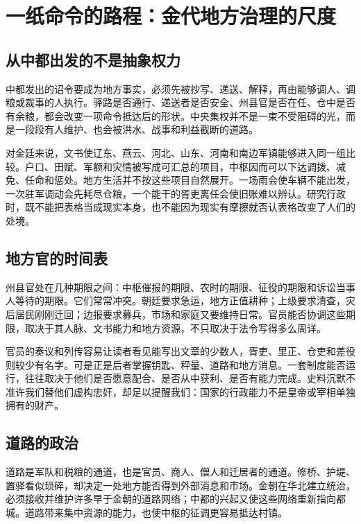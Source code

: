 \section{一纸命令的路程：金代地方治理的尺度}

\subsection{从中都出发的不是抽象权力}

中都发出的诏令要成为地方事实，必须先被抄写、递送、解释，再由能够调人、调粮或裁事的人执行。驿路是否通行、递送者是否安全、州县官是否在任、仓中是否有余粮，都会改变一项命令抵达后的形状。中央集权并不是一束不受阻碍的光，而是一段段有人维护、也会被洪水、战事和利益截断的道路。

对金廷来说，文书使辽东、燕云、河北、山东、河南和南边军镇能够进入同一组比较。户口、田赋、军额和灾情被写成可汇总的项目，中枢因而可以下达调拨、减免、任命和惩处。地方生活并不按这些项目自然展开。一场雨会使车辆不能出发，一次驻军调动会先耗尽仓粮，一个能干的胥吏离任会使旧账难以辨认。研究行政时，既不能把表格当成现实本身，也不能因为现实有摩擦就否认表格改变了人们的处境。

\subsection{地方官的时间表}

州县官处在几种期限之间：中枢催报的期限、农时的期限、征役的期限和诉讼当事人等待的期限。它们常常冲突。朝廷要求急运，地方正值耕种；上级要求清查，灾后居民刚刚迁回；边报要求募兵，市场和家庭又要维持日常。官员能否协调这些期限，取决于其人脉、文书能力和地方资源，不只取决于法令写得多么周详。

官员的奏议和列传容易让读者看见能写出文章的少数人，胥吏、里正、仓吏和差役则较少有名字。可是正是后者掌握钥匙、秤量、道路和地方消息。一套制度能否运行，往往取决于他们是否愿意配合、是否从中获利、是否有能力完成。史料沉默不准许我们替他们虚构忠奸，却足以提醒我们：国家的行政能力不是皇帝或宰相单独拥有的财产。

\subsection{道路的政治}

道路是军队和税粮的通道，也是官员、商人、僧人和迁居者的通道。修桥、护堤、置驿看似琐碎，却决定一处地方能否得到外部消息和市场。金朝在华北建立统治，必须接收并维护许多早于金朝的道路网络；中都的兴起又使这些网络重新指向都城。道路带来集中资源的能力，也使中枢的征调更容易抵达村镇。

